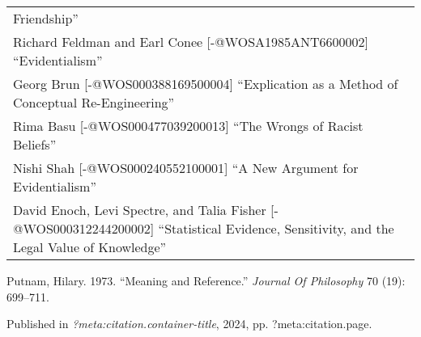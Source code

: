 \documentclass[
  10pt,
  letterpaper,
  DIV=11,
  numbers=noendperiod,
  twoside]{scrartcl}
\newlength{\cslhangindent}
\newenvironment{CSLReferences}[2] %
 {\begin{list}{}{%
  \setlength{\itemindent}{0pt}
  \setlength{\leftmargin}{0pt}
  \setlength{\parsep}{0pt}
  \ifodd #1
   \setlength{\leftmargin}{\cslhangindent}
   \setlength{\itemindent}{-1\cslhangindent}
  \fi
  \setlength{\itemsep}{#2\baselineskip}}}
 {\end{list}}
\begin{document}
\begin{longtable}[]{@{}
  >{\raggedright\arraybackslash}p{}@{}}
Friendship'' \\
Richard Feldman and Earl Conee {[}-@WOSA1985ANT6600002{]}
``Evidentialism'' \\
Georg Brun {[}-@WOS000388169500004{]} ``Explication as a Method of
Conceptual Re-Engineering'' \\
Rima Basu {[}-@WOS000477039200013{]} ``The Wrongs of Racist Beliefs'' \\
Nishi Shah {[}-@WOS000240552100001{]} ``A New Argument for
Evidentialism'' \\
David Enoch, Levi Spectre, and Talia Fisher {[}-@WOS000312244200002{]}
``Statistical Evidence, Sensitivity, and the Legal Value of
Knowledge'' \\

\end{longtable}

\label{refs}
\begin{CSLReferences}{1}{0}
Putnam, Hilary. 1973. {``Meaning and Reference.''} \emph{Journal Of
Philosophy} 70 (19): 699--711.

\end{CSLReferences}



\noindent Published in\emph{
?meta:citation.container-title}, 2024, pp. ?meta:citation.page.
\end{document}
